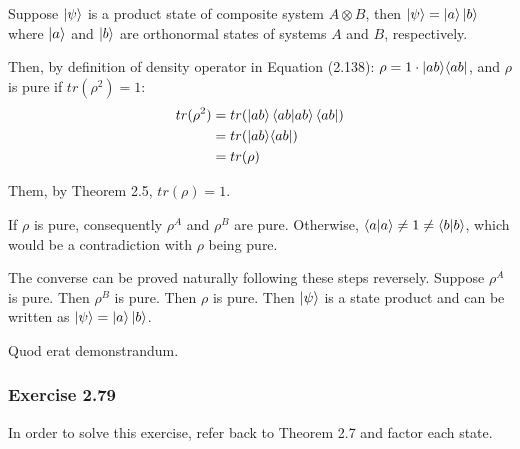 Suppose $\ket{\psi}$ is a product state of composite system
$A \otimes B$, then $\ket{\psi} = \ket{a}\ket{b}$ where
$\ket{a}$ and $\ket{b}$ are orthonormal states of systems
$A$ and $B$, respectively.

Then, by definition of density operator in Equation (2.138):
$\rho = 1 \cdot \mathop{\mathinner{ |{ab}\rangle \langle{ab}|}}$, and $\rho$ is pure if $tr(\rho^2) = 1$:
\begin{align}
    tr(\rho^2) &= tr(\ket{ab}\mathop{\mathinner{ \langle{ab}|{ab}\rangle}}\bra{ab}) \\
    &= tr(\mathop{\mathinner{ |{ab}\rangle \langle{ab}|}}) \\
    &= tr(\rho)
\end{align}

Them, by Theorem 2.5, $tr(\rho) = 1$.

If $\rho$ is pure, consequently $\rho^A$ and $\rho^B$ are pure.
Otherwise, $\mathop{\mathinner{ \langle{a}|{a}\rangle}} \neq 1 \neq \mathop{\mathinner{ \langle{b}|{b}\rangle}}$,
which would be a contradiction with $\rho$ being pure.

The converse can be proved naturally following these steps reversely.
Suppose $\rho^A$ is pure. Then $\rho^B$ is pure. Then $\rho$ is pure.
Then $\ket{\psi}$ is a state product and can be written as
$\ket{\psi} = \ket{a} \ket{b}$.

Quod erat demonstrandum.


\subsubsection{Exercise 2.79}
In order to solve this exercise, refer back to Theorem 2.7 and
factor each state.

